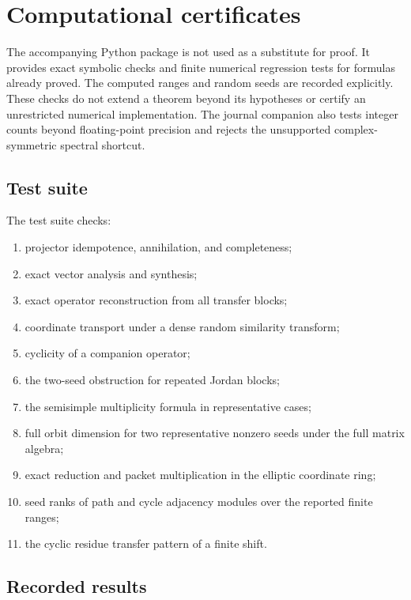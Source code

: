 \documentclass[11pt]{article}
\theoremstyle{definition}
\theoremstyle{remark}
\begin{document}
\section{Computational certificates}

The accompanying Python package is not used as a substitute for proof. It provides exact symbolic checks and finite numerical regression tests for formulas already proved. The computed ranges and random seeds are recorded explicitly. These checks do not extend a theorem beyond its hypotheses or certify an unrestricted numerical implementation. The journal companion also tests integer counts beyond floating-point precision and rejects the unsupported complex-symmetric spectral shortcut.

\subsection{Test suite}

The test suite checks:
\begin{enumerate}[label=(\roman*)]
\item projector idempotence, annihilation, and completeness;
\item exact vector analysis and synthesis;
\item exact operator reconstruction from all transfer blocks;
\item coordinate transport under a dense random similarity transform;
\item cyclicity of a companion operator;
\item the two-seed obstruction for repeated Jordan blocks;
\item the semisimple multiplicity formula in representative cases;
\item full orbit dimension for two representative nonzero seeds under the full matrix algebra;
\item exact reduction and packet multiplication in the elliptic coordinate ring;
\item seed ranks of path and cycle adjacency modules over the reported finite ranges;
\item the cyclic residue transfer pattern of a finite shift.
\end{enumerate}

\subsection{Recorded results}
\end{document}
